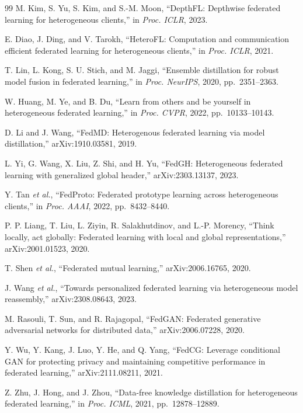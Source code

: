 \documentclass[10pt,journal]{IEEEtran}
\begin{document}
\begin{thebibliography}{99}
M. Kim, S. Yu, S. Kim, and S.-M. Moon, ``DepthFL: Depthwise federated learning for heterogeneous clients,'' in \emph{Proc. ICLR}, 2023.

E. Diao, J. Ding, and V. Tarokh, ``HeteroFL: Computation and communication efficient federated learning for heterogeneous clients,'' in \emph{Proc. ICLR}, 2021.

T. Lin, L. Kong, S. U. Stich, and M. Jaggi, ``Ensemble distillation for robust model fusion in federated learning,'' in \emph{Proc. NeurIPS}, 2020, pp.~2351--2363.

W. Huang, M. Ye, and B. Du, ``Learn from others and be yourself in heterogeneous federated learning,'' in \emph{Proc. CVPR}, 2022, pp.~10133--10143.

D. Li and J. Wang, ``FedMD: Heterogenous federated learning via model distillation,'' arXiv:1910.03581, 2019.

L. Yi, G. Wang, X. Liu, Z. Shi, and H. Yu, ``FedGH: Heterogeneous federated learning with generalized global header,'' arXiv:2303.13137, 2023.

Y. Tan \emph{et al.}, ``FedProto: Federated prototype learning across heterogeneous clients,'' in \emph{Proc. AAAI}, 2022, pp.~8432--8440.

P. P. Liang, T. Liu, L. Ziyin, R. Salakhutdinov, and L.-P. Morency, ``Think locally, act globally: Federated learning with local and global representations,'' arXiv:2001.01523, 2020.

T. Shen \emph{et al.}, ``Federated mutual learning,'' arXiv:2006.16765, 2020.

J. Wang \emph{et al.}, ``Towards personalized federated learning via heterogeneous model reassembly,'' arXiv:2308.08643, 2023.

M. Rasouli, T. Sun, and R. Rajagopal, ``FedGAN: Federated generative adversarial networks for distributed data,'' arXiv:2006.07228, 2020.

Y. Wu, Y. Kang, J. Luo, Y. He, and Q. Yang, ``FedCG: Leverage conditional GAN for protecting privacy and maintaining competitive performance in federated learning,'' arXiv:2111.08211, 2021.

Z. Zhu, J. Hong, and J. Zhou, ``Data-free knowledge distillation for heterogeneous federated learning,'' in \emph{Proc. ICML}, 2021, pp.~12878--12889.


\end{thebibliography}
\end{document}
